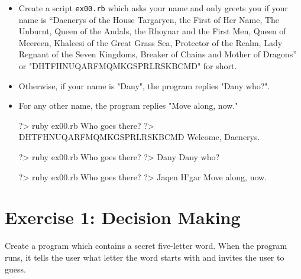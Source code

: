 \documentclass{42-en}
\begin{document}
\begin{itemize}

\item Create a script \texttt{ex00.rb} which asks your name and only greets you if your name is “Daenerys of the House Targaryen, the First of Her Name, The Unburnt, Queen of the Andals, the Rhoynar and the First Men, Queen of Meereen, Khaleesi of the Great Grass Sea, Protector of the Realm, Lady Regnant of the Seven Kingdoms, Breaker of Chains and Mother of Dragons” or "DHTFHNUQARFMQMKGSPRLRSKBCMD" for short. 
\item Otherwise, if your name is "Dany", the program replies "Dany who?". 
\item For any other name, the program replies "Move along, now."

\begin{42console}
	?> ruby ex00.rb
	Who goes there?
	?> DHTFHNUQARFMQMKGSPRLRSKBCMD
	Welcome, Daenerys.
\end{42console}

\begin{42console}
	?> ruby ex00.rb
	Who goes there?
	?> Dany
	Dany who?
\end{42console}

\begin{42console}
	?> ruby ex00.rb
	Who goes there?
	?> Jaqen H'gar
	Move along, now.
\end{42console}

\end{itemize}



\chapter{Exercise 1: Decision Making}

\makeheaderfiles

Create a program which contains a secret five-letter word.
When the program runs, it tells the user what letter the word starts with and invites the user to guess.\\
\end{document}
